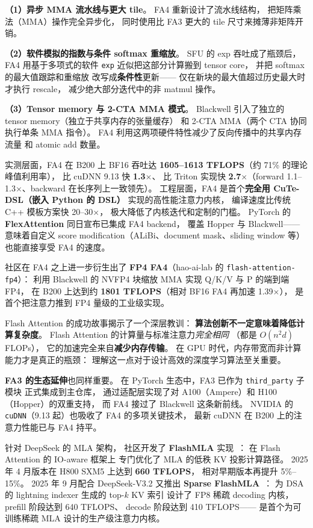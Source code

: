 \textbf{（1）异步 MMA 流水线与更大 tile}。
FA4 重新设计了流水线结构，
把矩阵乘法（MMA）操作完全异步化，
同时使用比 FA3 更大的 tile 尺寸来摊薄非矩阵开销。

\textbf{（2）软件模拟的指数与条件 softmax 重缩放}。
SFU 的 exp 吞吐成了瓶颈后，
FA4 用基于多项式的软件 \texttt{exp} 近似把这部分计算搬到 tensor core，
并把 softmax 的最大值跟踪和重缩放
改写成\textbf{条件性}更新——
仅在新块的最大值超过历史最大时才执行 rescale，
减少绝大部分迭代中的非 matmul 操作。

\textbf{（3）Tensor memory 与 2-CTA MMA 模式}。
Blackwell 引入了独立的 tensor memory（独立于共享内存的张量缓存）
和 2-CTA MMA（两个 CTA 协同执行单条 MMA 指令）。
FA4 利用这两项硬件特性减少了反向传播中的共享内存流量
和 atomic add 数量。

实测层面，FA4 在 B200 上 BF16 吞吐达
\textbf{1605--1613 TFLOPS}（约 71\% 的理论峰值利用率），
比 cuDNN 9.13 快 \textbf{1.3$\times$}、
比 Triton 实现快 \textbf{2.7$\times$}（forward 1.1--1.3$\times$、backward 在长序列上一致领先）。
工程层面，FA4 是首个\textbf{完全用 CuTe-DSL（嵌入 Python 的 DSL）}
实现的高性能注意力内核，
编译速度比传统 C++ 模板方案快 20--30$\times$，
极大降低了内核迭代和定制的门槛。
PyTorch 的 \textbf{FlexAttention} 同日宣布已集成 FA4 backend，
覆盖 Hopper 与 Blackwell——
意味着自定义 score modification（ALiBi、document mask、sliding window 等）
也能直接享受 FA4 的速度。

社区在 FA4 之上进一步衍生出了
\textbf{FP4 FA4}（hao-ai-lab 的 \texttt{flash-attention-fp4}）：
利用 Blackwell 的 NVFP4 块缩放 MMA 实现 Q/K/V 与 P 的端到端 FP4，
在 B200 上达到约 \textbf{1801 TFLOPS}（相对 BF16 FA4 再加速 1.39$\times$），
是首个把注意力推到 FP4 量级的工业级实现。

Flash Attention 的成功故事揭示了一个深层教训：
\textbf{算法创新不一定意味着降低计算复杂度}。
Flash Attention 的计算量与标准注意力\emph{完全相同}
（都是 $O(n^2 d)$ FLOPs），
它的加速完全来自\textbf{减少内存传输}。
在 GPU 时代，内存带宽而非计算能力才是真正的瓶颈：
理解这一点对于设计高效的深度学习算法至关重要。

\textbf{FA3 的生态延伸}也同样重要。
在 PyTorch 生态中，FA3 已作为 \texttt{third\_party} 子模块
正式集成到主仓库，
通过适配层实现了对 A100（Ampere）和 H100（Hopper）的双重支持，
而 FA4 接过了 Blackwell 这条新前线。
NVIDIA 的 \texttt{cuDNN}（9.13 起）也吸收了 FA4 的多项关键技术，
最新 cuDNN 在 B200 上的注意力性能已与 FA4 持平。

针对 DeepSeek 的 MLA 架构，
社区开发了 \textbf{FlashMLA} 实现~\cite{flashmla2025}：
在 Flash Attention 的 IO-aware 框架上
专门优化了 MLA 的低秩 KV 投影计算路径。
2025 年 4 月版本在 H800 SXM5 上达到 \textbf{660 TFLOPS}，
相对早期版本再提升 5\%--15\%。
2025 年 9 月配合 DeepSeek-V3.2 又推出
\textbf{Sparse FlashMLA}~\cite{flashmla2025}：
为 DSA 的 lightning indexer 生成的 top-$k$ KV 索引
设计了 FP8 稀疏 decoding 内核，
prefill 阶段达到 640 TFLOPS、
decode 阶段达到 410 TFLOPS——
是首个为可训练稀疏 MLA 设计的生产级注意力内核。

